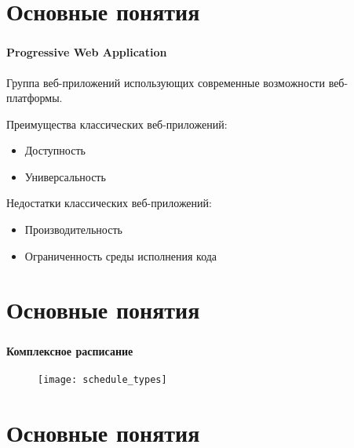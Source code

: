 
\frame[plain]{\titlepage}


\section{Основные понятия}

\begin{frame}
\frametitle{\insertsection}
\framesubtitle{Progressive Web Application}

Группа веб-приложений использующих современные возможности веб-платформы.

\vspace{5mm}

Преимущества классических веб-приложений:
\begin{itemize}
    \item Доступность
    \item Универсальность
\end{itemize}

Недостатки классических веб-приложений:
\begin{itemize}
    \item Производительность
    \item Ограниченность среды исполнения кода
\end{itemize}

\end{frame}


\section{Основные понятия}

\begin{frame}
\frametitle{\insertsection}
\framesubtitle{Комплексное расписание}

\begin{figure}
    \center
    \texttt{[image: schedule\_types]}
\end{figure}
\end{frame}


\section{Основные понятия}

